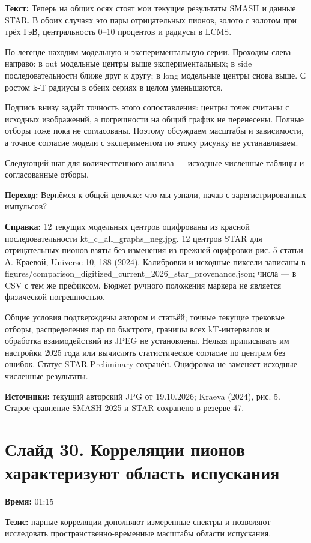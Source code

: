 \documentclass[11pt,a4paper]{article}
\begin{document}
\textbf{Текст:} Теперь на общих осях стоят мои текущие результаты SMASH и данные STAR. В обоих случаях это пары отрицательных пионов, золото с золотом при трёх ГэВ, центральность 0–10 процентов и радиусы в LCMS.

По легенде находим модельную и экспериментальную серии. Проходим слева направо: в out модельные центры выше экспериментальных; в side последовательности ближе друг к другу; в long модельные центры снова выше. С ростом k-T радиусы в обеих сериях в целом уменьшаются.

Подпись внизу задаёт точность этого сопоставления: центры точек считаны с исходных изображений, а погрешности на общий график не перенесены. Полные отборы тоже пока не согласованы. Поэтому обсуждаем масштабы и зависимости, а точное согласие модели с экспериментом по этому рисунку не устанавливаем.

Следующий шаг для количественного анализа — исходные численные таблицы и согласованные отборы.

\textbf{Переход:} Вернёмся к общей цепочке: что мы узнали, начав с зарегистрированных импульсов?

\textbf{Справка:} 12 текущих модельных центров оцифрованы из красной последовательности kt\_c\_all\_graphs\_neg.jpg. 12 центров STAR для отрицательных пионов взяты без изменения из прежней оцифровки рис. 5 статьи А. Краевой, Universe 10, 188 (2024). Калибровки и исходные пиксели записаны в figures/comparison\_digitized\_current\_2026\_star\_provenance.json; числа — в CSV с тем же префиксом. Бюджет ручного положения маркера не является физической погрешностью.

Общие условия подтверждены автором и статьёй; точные текущие трековые отборы, распределения пар по быстроте, границы всех kT-интервалов и обработка взаимодействий из JPEG не установлены. Нельзя приписывать им настройки 2025 года или вычислять статистическое согласие по центрам без ошибок. Статус STAR Preliminary сохранён. Оцифровка не заменяет исходные численные результаты.

\textbf{Источники:} текущий авторский JPG от 19.10.2026; Kraeva (2024), рис. 5. Старое сравнение SMASH 2025 и STAR сохранено в резерве 47.

\clearpage
\section*{Слайд 30. Корреляции пионов характеризуют область испускания}
\textbf{Время:} 01:15

\textbf{Тезис:} парные корреляции дополняют измеренные спектры и позволяют исследовать пространственно-временные масштабы области испускания.
\end{document}
